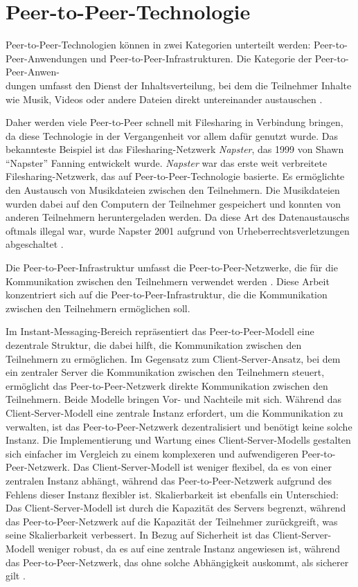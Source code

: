 \section{Peer-to-Peer-Technologie}
\label{subsec:peer_to_peer_technologie}


Peer-to-Peer-Technologien können in zwei Kategorien unterteilt werden: Peer-to-Peer-Anwendungen und Peer-to-Peer-Infrastrukturen. Die Kategorie der Peer-to-Peer-Anwen-\\dungen umfasst den Dienst der Inhaltsverteilung, bei dem die Teilnehmer Inhalte wie Musik, Videos oder andere Dateien direkt untereinander austauschen \Parencite[730-731]{Khatibi_StructuredUnstructuredP2P}. 

Daher werden viele Peer-to-Peer schnell mit Filesharing in Verbindung bringen, da diese Technologie in der Vergangenheit vor allem dafür genutzt wurde. Das bekannteste Beispiel ist das Filesharing-Netzwerk \textit{Napster}, das 1999 von Shawn \enquote{Napster} Fanning entwickelt wurde. \textit{Napster} war das erste weit verbreitete Filesharing-Netzwerk, das auf Peer-to-Peer-Technologie basierte. Es ermöglichte den Austausch von Musikdateien zwischen den Teilnehmern. Die Musikdateien wurden dabei auf den Computern der Teilnehmer gespeichert und konnten von anderen Teilnehmern heruntergeladen werden. Da diese Art des Datenaustauschs oftmals illegal war, wurde Napster 2001 aufgrund von Urheberrechtsverletzungen abgeschaltet \parencite[S. 55-57]{Mahlmann_P2PNetzwerke}.

Die Peer-to-Peer-Infrastruktur umfasst die Peer-to-Peer-Netzwerke, die für die Kommunikation zwischen den Teilnehmern verwendet werden \parencite[S. 730-731]{Khatibi_StructuredUnstructuredP2P}. Diese Arbeit konzentriert sich auf die Peer-to-Peer-Infrastruktur, die die Kommunikation zwischen den Teilnehmern ermöglichen soll.

Im Instant-Messaging-Bereich repräsentiert das Peer-to-Peer-Modell eine dezentrale Struktur, die dabei hilft, die Kommunikation zwischen den Teilnehmern zu ermöglichen. Im Gegensatz zum Client-Server-Ansatz, bei dem ein zentraler Server die Kommunikation zwischen den Teilnehmern steuert, ermöglicht das Peer-to-Peer-Netzwerk direkte Kommunikation zwischen den Teilnehmern. Beide Modelle bringen Vor- und Nachteile mit sich. Während das Client-Server-Modell eine zentrale Instanz erfordert, um die Kommunikation zu verwalten, ist das Peer-to-Peer-Netzwerk dezentralisiert und benötigt keine solche Instanz. Die Implementierung und Wartung eines Client-Server-Modells gestalten sich einfacher im Vergleich zu einem komplexeren und aufwendigeren Peer-to-Peer-Netzwerk. Das Client-Server-Modell ist weniger flexibel, da es von einer zentralen Instanz abhängt, während das Peer-to-Peer-Netzwerk aufgrund des Fehlens dieser Instanz flexibler ist. Skalierbarkeit ist ebenfalls ein Unterschied: Das Client-Server-Modell ist durch die Kapazität des Servers begrenzt, während das Peer-to-Peer-Netzwerk auf die Kapazität der Teilnehmer zurückgreift, was seine Skalierbarkeit verbessert. In Bezug auf Sicherheit ist das Client-Server-Modell weniger robust, da es auf eine zentrale Instanz angewiesen ist, während das Peer-to-Peer-Netzwerk, das ohne solche Abhängigkeit auskommt, als sicherer gilt \parencite[S. 6-8]{Mahlmann_P2PNetzwerke}.


